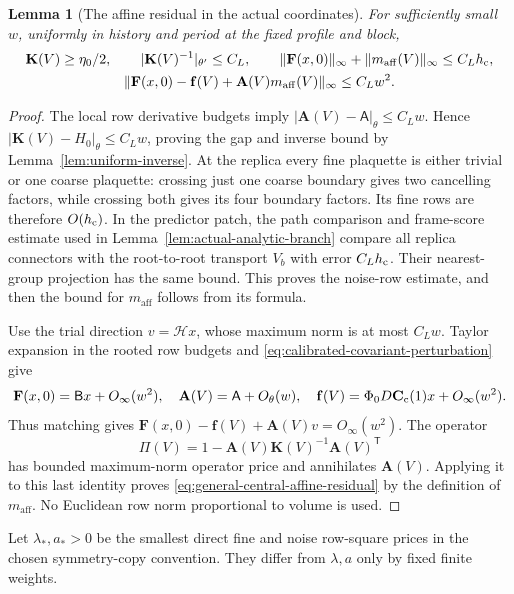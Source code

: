 \documentclass[11pt,reqno]{amsart}
\numberwithin{equation}{section}
\newtheorem{lemma}[theorem]{Lemma}
\theoremstyle{definition}
\theoremstyle{remark}
\begin{document}
\begin{lemma}[The affine residual in the actual coordinates]
\label{lem:general-central-affine-residual}
For sufficiently small \(w\), uniformly in history and period
at the fixed profile and block,
\begin{gather}
 \mathbf K(V)\ge\eta_0/2,\qquad
 |\mathbf K(V)^{-1}|_{\theta'}\le C_L,\qquad
 \|\mathbf F(x,0)\|_\infty+\|m_{\mathrm{aff}}(V)\|_\infty\le C_Lh_{\rm c},
 \label{eq:general-central-affine-size}\\
 \|\mathbf F(x,0)-\mathbf f(V)+\mathbf A(V)m_{\mathrm{aff}}(V)\|_\infty
                                                   \le C_Lw^2.
 \label{eq:general-central-affine-residual}
\end{gather}
\end{lemma}
\begin{proof}
The local row derivative budgets imply
\(|\mathbf A(V)-\mathsf A|_\theta\le C_Lw\).
Hence \(|\mathbf K(V)-H_0|_\theta\le C_Lw\), proving the
gap and inverse bound by Lemma~\ref{lem:uniform-inverse}.
At the replica every fine plaquette is either trivial or one
coarse plaquette: crossing just one coarse boundary gives two
cancelling factors, while crossing both gives its four boundary
factors. Its fine rows are therefore \(O(h_{\rm c})\).
In the predictor patch, the path comparison and frame-score
estimate used in Lemma~\ref{lem:actual-analytic-branch} compare
all replica connectors with the root-to-root transport \(V_b\)
with error \(C_Lh_{\rm c}\). Their nearest-group projection has
the same bound. This proves the noise-row estimate, and then
the bound for \(m_{\mathrm{aff}}\) follows from its formula.

Use the trial direction \(v=\mathcal Hx\), whose maximum norm
is at most \(C_Lw\). Taylor expansion in the rooted row budgets
and \eqref{eq:calibrated-covariant-perturbation} give
\[
 \mathbf F(x,0)=\mathsf Bx+O_\infty(w^2),\quad
 \mathbf A(V)=\mathsf A+O_\theta(w),\quad
 \mathbf f(V)=\Phi_0D\mathbf C_{\rm c}(1)x+O_\infty(w^2).
\]
Thus matching gives
\(\mathbf F(x,0)-\mathbf f(V)+\mathbf A(V)v=O_\infty(w^2)\).
The operator
\[
 \Pi(V)=1-\mathbf A(V)\mathbf K(V)^{-1}\mathbf A(V)^{\mathsf T}
\]
has bounded maximum-norm operator price and annihilates
\(\mathbf A(V)\). Applying it to this last identity proves
\eqref{eq:general-central-affine-residual} by the definition of
\(m_{\mathrm{aff}}\). No Euclidean row norm proportional to volume is used.
\end{proof}

Let \(\lambda_*,a_*>0\) be the smallest direct fine and noise
row-square prices in the chosen symmetry-copy convention.
They differ from \(\lambda,a\) only by fixed finite weights.
\end{document}
